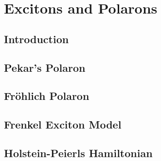 
\chapter{Excitons and Polarons} %

\label{Chapter3} %



\cite{ghosh2020excitons}


\section{Introduction}

\section{Pekar's Polaron}

\section{Fr{\"o}hlich Polaron}

\section{Frenkel Exciton Model}

\section{Holstein-Peierls Hamiltonian}


